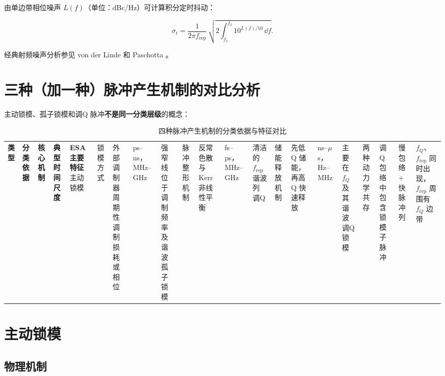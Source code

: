 \documentclass[11pt,a4paper]{article}
\newcommand{\rep}{f_{\text{rep}}}
\begin{document}
由单边带相位噪声 $L(f)$（单位：dBc/Hz）可计算积分定时抖动：

\begin{equation}\label{eq:integrated_jitter}
\boxed{\sigma_t
= \frac{1}{2\pi\rep}\,
\sqrt{2\int_{f_1}^{f_2} 10^{L(f)/10}\,\dd{f}} }.
\end{equation}

经典射频噪声分析参见 von der Linde \cite{vonderLinde1986} 和 Paschotta \cite{Paschotta2004}。

\section{三种（加一种）脉冲产生机制的对比分析}

主动锁模、孤子锁模和调Q 脉冲\textbf{不是同一分类层级}的概念：

\begin{table}[htbp]
\centering
\caption{四种脉冲产生机制的分类依据与特征对比}
\label{tab:classification}
\renewcommand{\arraystretch}{1.5}
\begin{tabular}{@{}p{2cm} p{2.2cm} p{2.8cm} p{2.2cm} p{2.4cm}@{}}
\toprule
\textbf{类型} & \textbf{分类依据} & \textbf{核心机制} & \textbf{典型时间尺度} & \textbf{ESA 主要特征} \
\midrule
主动锁模 & 锁模方式 & 外部调制器周期性调制损耗或相位 & ps--ns，MHz--GHz & 强窄线位于调制频率及谐波 \
\hline
孤子锁模 & 脉冲整形机制 & 反常色散与 Kerr 非线性平衡 & fs--ps，MHz--GHz & 清洁的 $\rep$ 谐波列 \
\hline
调Q & 储能释放机制 & 先低 Q 储能，再高 Q 快速释放 & ns--$\mu$s，Hz--MHz & 主要在 $f_Q$ 及其谐波 \
\hline
调Q 锁模 & 两种动力学共存 & 调Q 包络中包含锁模子脉冲 & 慢包络 + 快脉冲列 & $f_Q$、$\rep$ 同时出现，$\rep$ 周围有 $f_Q$ 边带 \
\bottomrule
\end{tabular}
\end{table}

\section{主动锁模}

\subsection{物理机制}
\end{document}
